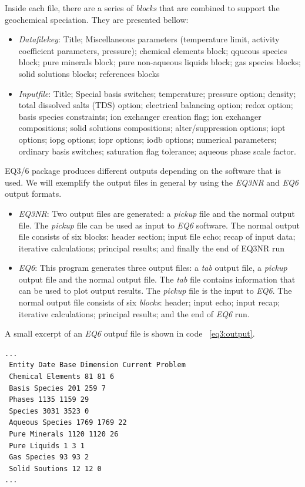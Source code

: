 Inside each file, there are a series of \emph{blocks} that are combined to support the geochemical speciation. They are presented bellow:
\begin{itemize}
\item \emph{Datafilekey}: Title; Miscellaneous parameters (temperature limit, activity coefficient parameters, pressure); chemical elements block; qqueous species block; pure minerals block; pure non-aqueous liquids block; gas species blocks; solid solutions blocks; references blocks
\item \emph{Inputfile}: Title; Special basis switches; temperature; pressure option; density; total dissolved salts (TDS) option; electrical balancing option; redox option; basis species constraints; ion exchanger creation flag; ion exchanger compositions; solid solutions compositions; alter/suppression options; iopt options; iopg options; iopr options; iodb options; numerical parameters; ordinary basis switches; saturation flag tolerance; aqueous phase scale factor.
\end{itemize}

EQ3/6 package produces different outputs depending on the software that is used. We will exemplify the output files in general by using the \emph{EQ3NR} and \emph{EQ6} output formats. 
\begin{itemize}
\item \emph{EQ3NR}: Two output files are generated: a \emph{pickup} file and the normal output file. The \emph{pickup} file can be used as input to \emph{EQ6} software. The normal output file consists of six blocks: header section; input file echo; recap of input data; iterative calculations; principal results; and finally the end of EQ3NR run
\item \emph{EQ6}: This program generates three output files: a \emph{tab} output file, a \emph{pickup} output file and the normal output file. The \emph{tab} file contains information that can be used to plot output results. The \emph{pickup} file is the input to \emph{EQ6}. The normal output file consists of six \emph{blocks}: header; input echo; input recap; iterative calculations; principal results; and the end of \emph{EQ6} run.
\end{itemize}

A small excerpt of an \emph{EQ6} outpuf file is shown in code ~\ref{eq3:output}.

\begin{minipage}[c]{0.92\textwidth}
\begin{lstlisting}[frame=single, caption=Excerpt of \emph{EQ6} output file, label=eq3:output]
...
 Entity Date Base Dimension Current Problem
 Chemical Elements 81 81 6
 Basis Species 201 259 7
 Phases 1135 1159 29
 Species 3031 3523 0
 Aqueous Species 1769 1769 22
 Pure Minerals 1120 1120 26
 Pure Liquids 1 3 1
 Gas Species 93 93 2
 Solid Soutions 12 12 0
...
\end{lstlisting}
\end{minipage}

